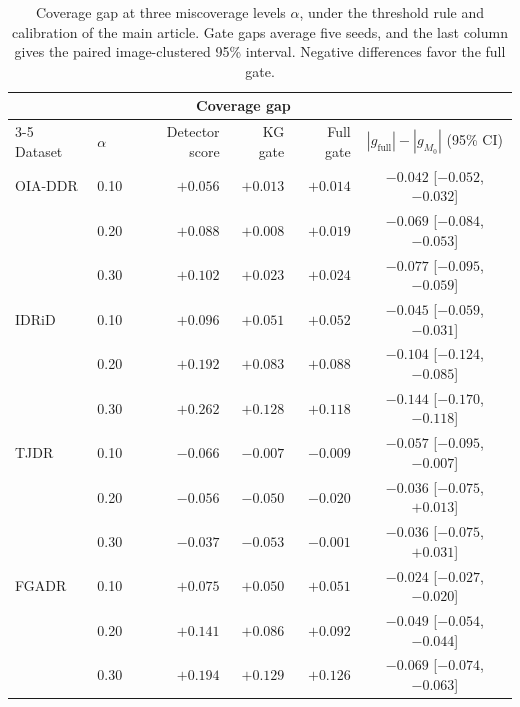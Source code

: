 \begin{table}[htbp]
\centering
\caption{Coverage gap at three miscoverage levels $\alpha$, under the threshold rule and calibration of the main article. Gate gaps average five seeds, and the last column gives the paired image-clustered 95\% interval. Negative differences favor the full gate.}
\label{tab:alpha_sensitivity}
\footnotesize
\setlength{\tabcolsep}{4pt}
\begin{tabular}{llrrrc}
\toprule
 & & \multicolumn{3}{c}{Coverage gap} & \\
\cmidrule(lr){3-5}
Dataset & $\alpha$ & Detector score & KG gate & Full gate & $|g_{\mathrm{full}}|-|g_{M_0}|$ (95\% CI) \\
\midrule
OIA-DDR & 0.10 & $+0.056$ & $+0.013$ & $+0.014$ & $-0.042$ [$-0.052$, $-0.032$] \\
 & 0.20 & $+0.088$ & $+0.008$ & $+0.019$ & $-0.069$ [$-0.084$, $-0.053$] \\
 & 0.30 & $+0.102$ & $+0.023$ & $+0.024$ & $-0.077$ [$-0.095$, $-0.059$] \\
\midrule
IDRiD & 0.10 & $+0.096$ & $+0.051$ & $+0.052$ & $-0.045$ [$-0.059$, $-0.031$] \\
 & 0.20 & $+0.192$ & $+0.083$ & $+0.088$ & $-0.104$ [$-0.124$, $-0.085$] \\
 & 0.30 & $+0.262$ & $+0.128$ & $+0.118$ & $-0.144$ [$-0.170$, $-0.118$] \\
\midrule
TJDR & 0.10 & $-0.066$ & $-0.007$ & $-0.009$ & $-0.057$ [$-0.095$, $-0.007$] \\
 & 0.20 & $-0.056$ & $-0.050$ & $-0.020$ & $-0.036$ [$-0.075$, $+0.013$] \\
 & 0.30 & $-0.037$ & $-0.053$ & $-0.001$ & $-0.036$ [$-0.075$, $+0.031$] \\
\midrule
FGADR & 0.10 & $+0.075$ & $+0.050$ & $+0.051$ & $-0.024$ [$-0.027$, $-0.020$] \\
 & 0.20 & $+0.141$ & $+0.086$ & $+0.092$ & $-0.049$ [$-0.054$, $-0.044$] \\
 & 0.30 & $+0.194$ & $+0.129$ & $+0.126$ & $-0.069$ [$-0.074$, $-0.063$] \\
\bottomrule
\end{tabular}
\end{table}
